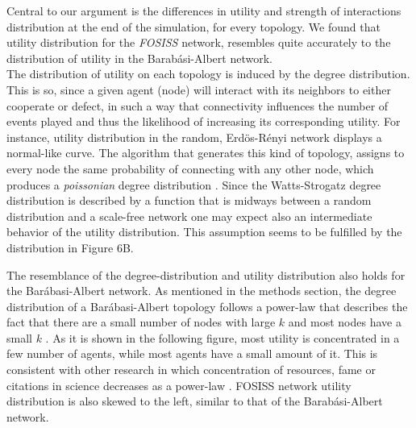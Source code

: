 \documentclass[11pt]{article}
\begin{document}
\FloatBarrier

Central to our argument is the differences in utility and strength of
interactions distribution at the end of the simulation, for every topology. We
found that utility distribution for the \textit{FOSISS} network, resembles quite
accurately to the distribution of utility in the Barab\'asi-Albert
network.\\ 


The distribution of utility on each topology is induced by the degree
distribution. This is so, since a given agent (node) will interact with its
neighbors to either cooperate or defect, in such a way that connectivity
influences the number of events played and thus the likelihood of increasing its
corresponding utility. For instance, utility distribution in the random,
Erd\"{o}s-R\'enyi network displays a normal-like curve. The algorithm that
generates this kind of topology, assigns to every node the same probability of
connecting with any other node, which produces a \textit{poissonian} degree
distribution \cite{Erdos1959}. Since the Watts-Strogatz degree distribution is
described by a function that is midways between a random distribution and a
scale-free network \cite{Barrat2000} one may expect also  an intermediate
behavior of the utility distribution. This assumption seems to be fulfilled by
the distribution in Figure 6B. 

The resemblance of the degree-distribution and utility distribution also holds
for the Bar\'abasi-Albert network. As mentioned in the methods section, the
degree distribution of a Bar\'abasi-Albert topology follows a power-law that
describes the fact that there are a small number of nodes with large $k$ and most
nodes have a small $k$ \cite{Barabasi1999}. As it is shown in the following
figure, most utility is concentrated in a few number of agents, while most
agents have a small amount of it. This is consistent with other research in
which concentration of resources, fame or citations in science decreases as a
power-law \cite{Simon1955,Price1965,Merton1968}. FOSISS network utility
distribution is also skewed to the left, similar to that of the
Barab\'asi-Albert network. \\ 
\end{document}
